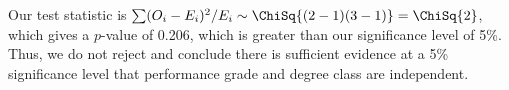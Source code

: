 \begin{solution}
\begin{ppart}
        Our test statistic is $\sum (O_i - E_i)^2 / E_i \sim \ChiSq{(2-1)(3-1)} = \ChiSq{2}$, which gives a $p$-value of 0.206, which is greater than our significance level of 5\%. Thus, we do not reject \nullhyp{} and conclude there is sufficient evidence at a 5\% significance level that performance grade and degree class are independent.
    \end{ppart}
\end{solution}